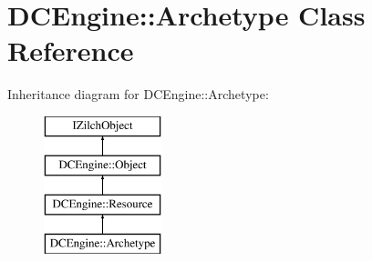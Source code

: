 \hypertarget{classDCEngine_1_1Archetype}{\section{D\-C\-Engine\-:\-:Archetype Class Reference}
\label{classDCEngine_1_1Archetype}
}
Inheritance diagram for D\-C\-Engine\-:\-:Archetype\-:\begin{figure}[H]
\begin{center}
\leavevmode
\includegraphics[height=4.000000cm]{classDCEngine_1_1Archetype}
\end{center}
\end{figure}
